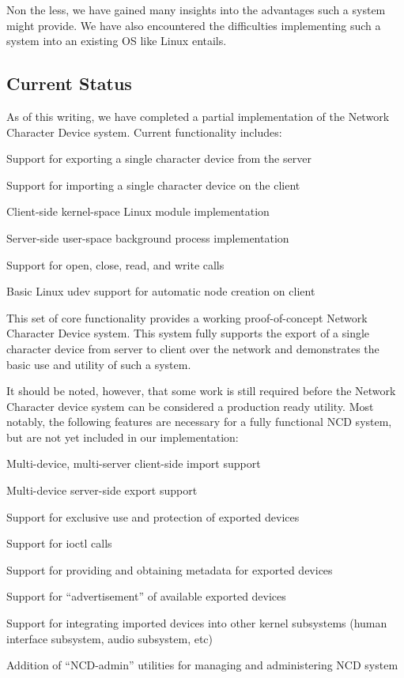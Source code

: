 \documentclass[11pt,twocolumn]{article}
\newenvironment{packed_item}{
\begin{itemize}
  \setlength{\itemsep}{1pt}
  \setlength{\parskip}{0pt}
  \setlength{\parsep}{0pt}
}{\end{itemize}}
\begin{document}
Non the less, we have gained many insights into the advantages such a
system might provide. We have also encountered the difficulties
implementing such a system into an existing OS like Linux entails.

\subsection{Current Status}
\label{sec:currentstatus}

As of this writing, we have completed a partial implementation of
the Network Character Device system. Current functionality includes:

\begin{packed_item}
\item Support for exporting a single character device from the server
\item Support for importing a single character device on the client
\item Client-side kernel-space Linux module implementation
\item Server-side user-space background process implementation
\item Support for open, close, read, and write calls
\item Basic Linux udev support for automatic node creation on client
\end{packed_item}

This set of core functionality provides a working proof-of-concept
Network Character Device system. This system fully supports the
export of a single character device from server to client over the
network and demonstrates the basic use and utility of such a system.

It should be noted, however, that some work is still required before
the Network Character device system can be considered a production
ready utility. Most notably, the following features are necessary for
a fully functional NCD system, but are not yet included in our
implementation:

\begin{packed_item}
\item Multi-device, multi-server client-side import support
\item Multi-device server-side export support
\item Support for exclusive use and protection of exported devices
\item Support for ioctl calls
\item Support for providing and obtaining metadata for exported
  devices
\item Support for ``advertisement'' of available exported devices
\item Support for integrating imported devices into other kernel
  subsystems (human interface subsystem, audio subsystem, etc)
\item Addition of ``NCD-admin'' utilities for managing and administering
  NCD system
\end{packed_item}
\end{document}
